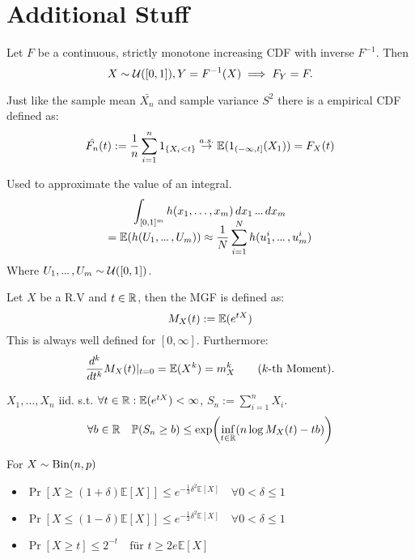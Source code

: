 \section{Additional Stuff}
\begin{theorem*}
  Let \(F\) be a continuous, strictly monotone increasing CDF with inverse \(F^{-1}\). Then
  \[X \sim \operatorname{\mathcal{U}}([0, 1]), Y = F^{-1}(X) \implies F_Y = F.\]

\end{theorem*}

\begin{definition*}
  Just like the sample mean \(\bar{X_n}\) and sample variance \(S^2\) there is a empirical CDF defined as:
  \[\hat{F_n}(t) := \frac{1}{n}\sum_{i=1}^n 1_{\{X_i < t\}} \stackrel{a.s.}{\to} \mathbb{E}(1_{(-\infty, t]}(X_1)) = F_X(t)\]
\end{definition*}

\begin{definition*}
  Used to approximate the value of an integral.
  \begin{multline*}
    \int_{[0, 1]^m} h(x_1, \ldots, x_m) \, dx_1 \sdots dx_m \\[-10pt]
    = \E(h(U_1, \sdots, U_m)) \approx \frac{1}{N} \sum_{i=1}^N h(u_1^i, \sdots, u_m^i)
  \end{multline*}
  Where \(U_1, \sdots, U_m \sim \Unif([0, 1])\).
\end{definition*}

\begin{definition*}
  Let \(X\) be a R.V and \(t \in \mathbb{R}\), then the MGF is defined as:
  \[M_X(t) := \mathbb{E}(e^{tX})\]
  This is always well defined for \([0, \infty]\). Furthermore:
  \[\frac{d^k}{dt^k} M_X(t) |_{t=0} = \mathbb{E}(X^k) = m_X^k \qquad (\text{\(k\)-th Moment}).\]
\end{definition*}

\begin{theorem*}
  \(X_1, \ldots, X_n\) iid. s.t. \(\forall t \in \mathbb{R}: \mathbb{E}(e^{tX}) < \infty \), \(S_n := \sum\limits_{i=1}^n X_i\).
  \[\forall b \in \mathbb{R} \quad \mathbb{P}(S_n \geq b) \leq \exp(\underset{t \in \mathbb{R}}{\inf}(n \log M_X(t) - tb))\]
  
  For \(X \sim \operatorname{Bin}(n, p)\)
  \begin{itemize}
      \item \(\Pr[X \geq (1+\delta)\mathbb{E}[X]] \leq e^{-\frac{1}{3}\delta^2\mathbb{E}[X]} \quad \forall 0 < \delta \leq 1\)
      \item \(\Pr[X \leq (1-\delta)\mathbb{E}[X]] \leq e^{-\frac{1}{2}\delta^2\mathbb{E}[X]} \quad \forall 0 < \delta \leq 1\)
      \item \(\Pr[X \geq t] \leq 2^{-t} \quad \text{für } t \geq 2e\mathbb{E}[X]\)
  \end{itemize}
\end{theorem*}
